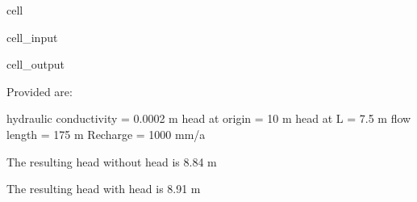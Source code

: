 \documentclass[letterpaper,10pt,english]{jupyterBook}
\begin{document}
\begin{sphinxuseclass}{cell}
\begin{sphinxVerbatimInput}
\begin{sphinxuseclass}{cell_input}
\begin{sphinxVerbatim}[commandchars=\\\{\}]
     
\end{sphinxVerbatim}

\end{sphinxuseclass}\end{sphinxVerbatimInput}
\begin{sphinxVerbatimOutput}

\begin{sphinxuseclass}{cell_output}
\begin{sphinxVerbatim}[commandchars=\\\{\}]
Provided are:

hydraulic conductivity = 0.0002 m
head at origin = 10 m
head at L = 7.5 m
flow length = 175 m
Recharge = 1000 mm/a 

The resulting head without head is 8.84 m 

The resulting head with head is 8.91 m 
\end{sphinxVerbatim}

\end{sphinxuseclass}\end{sphinxVerbatimOutput}

\end{sphinxuseclass}
\end{document}
